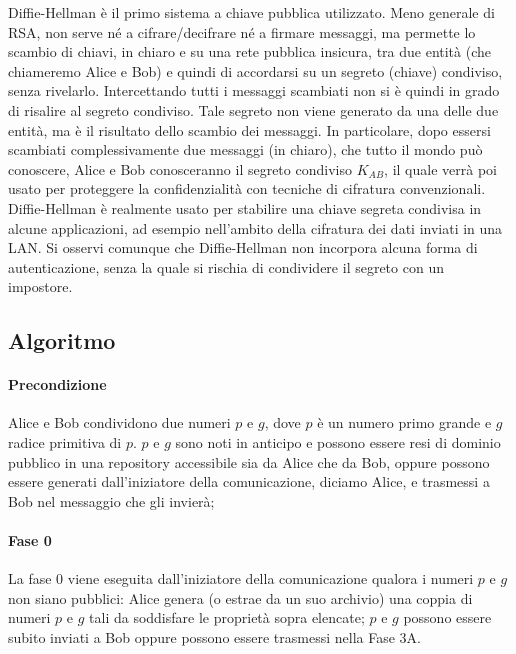 Diffie-Hellman è il primo sistema a chiave pubblica utilizzato. Meno generale di RSA, non serve né a cifrare/decifrare né a firmare messaggi, ma permette lo scambio di chiavi, in chiaro e su una rete pubblica insicura, tra due entità (che chiameremo Alice e Bob) e quindi di accordarsi su un segreto (chiave) condiviso, senza rivelarlo. Intercettando tutti i messaggi scambiati non si è quindi in grado di risalire al segreto condiviso. Tale segreto non viene generato da una delle due entità, ma è il risultato dello scambio dei messaggi. In particolare, dopo essersi scambiati complessivamente due messaggi (in chiaro), che tutto il mondo può conoscere, Alice e Bob conosceranno il segreto condiviso $K_{AB}$, il quale verrà poi usato per proteggere la confidenzialità con tecniche di cifratura convenzionali.
\newline \newline
Diffie-Hellman è realmente usato per stabilire una chiave segreta condivisa in alcune applicazioni, ad esempio nell'ambito della cifratura dei dati inviati in una LAN. Si osservi comunque che Diffie-Hellman non incorpora alcuna forma di autenticazione, senza la quale si rischia di condividere il segreto con un impostore.  

\subsection{Algoritmo} 
\paragraph{Precondizione}
Alice e Bob condividono due numeri $p$ e $g$, dove $p$ è un numero primo grande e $g$ radice primitiva di $p$. $p$ e $g$ sono noti in anticipo e possono essere resi di dominio pubblico in una repository accessibile sia da Alice che da Bob, oppure possono essere generati dall'iniziatore della comunicazione, diciamo Alice, e trasmessi a Bob nel messaggio che gli invierà;
\paragraph{Fase 0}
La fase 0 viene eseguita dall'iniziatore della comunicazione qualora i numeri $p$ e $g$ non siano pubblici: Alice genera (o estrae da un suo archivio) una coppia di numeri $p$ e $g$ tali da soddisfare le proprietà sopra elencate; $p$ e $g$ possono essere subito inviati a Bob oppure possono essere trasmessi nella Fase 3A.
